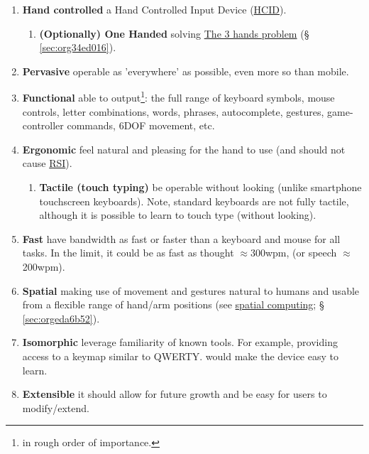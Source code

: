 \documentclass[logo,bsc,singlespacing,parskip]{infthesis}
\begin{document}
\begin{enumerate}
\item \textbf{Hand controlled} a Hand Controlled Input Device (\hyperref[org917851e]{HCID}).

\begin{enumerate}
\item \textbf{(Optionally) One Handed} solving \hyperref[sec:org34ed016]{The 3 hands problem} (§ \ref{sec:org34ed016}).
\end{enumerate}

\item \textbf{Pervasive} operable as 'everywhere' as possible, even more so than mobile.

\item \textbf{Functional} able to output\footnote{in rough order of importance.}: the full range of keyboard symbols, mouse controls, letter combinations, words, phrases, autocomplete, gestures, game-controller commands, 6DOF movement, etc.

\item \textbf{Ergonomic} feel natural and pleasing for the hand to use (and should not cause \hyperref[orgafdb7af]{RSI}).

\begin{enumerate}
\item \textbf{Tactile (touch typing)} be operable without looking (unlike smartphone touchscreen keyboards). Note, standard keyboards are not fully tactile, although it is possible to learn to touch type (without looking).
\end{enumerate}

\item \textbf{Fast} have bandwidth as fast or faster than a keyboard and mouse for all tasks. In the limit, it could be as fast as thought \(\approx\)300wpm, (or speech \(\approx\)200wpm).

\item \textbf{Spatial} making use of movement and gestures natural to humans and usable from a flexible range of hand/arm positions (see \hyperref[sec:orgeda6b52]{spatial computing}; § \ref{sec:orgeda6b52}).

\item \textbf{Isomorphic} leverage familiarity of known tools. For example, providing access to a keymap similar to QWERTY. would make the device easy to learn.

\item \textbf{Extensible} it should allow for future growth and be easy for users to modify/extend.
\end{enumerate}
\end{document}
